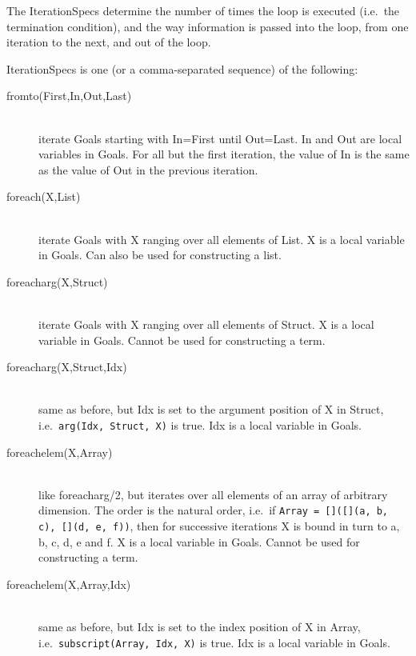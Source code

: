 The IterationSpecs determine the number of times the loop is executed
(i.e.\ the termination condition), and the way information is passed
into the loop, from one iteration to the next, and out of the loop.

IterationSpecs is one (or a comma-separated sequence) of the following:

\begin{description}
\item[fromto(First,In,Out,Last)]\ \\
%
    iterate Goals starting with In=First until Out=Last.
    In and Out are local variables in Goals. For all but the first
    iteration, the value of In is the same as the value of Out in the
    previous iteration.

\item[foreach(X,List)]\ \\
%
    iterate Goals with X ranging over all elements of List.
    X is a local variable in Goals.
    Can also be used for constructing a list.

\item[foreacharg(X,Struct)]\ \\
%
    iterate Goals with X ranging over all elements of Struct.
    X is a local variable in Goals.
    Cannot be used for constructing a term.

\item[foreacharg(X,Struct,Idx)]\ \\
    same as before, but Idx is set to the argument position of X in Struct,
    i.e.\ \verb+arg(Idx, Struct, X)+ is true.
    Idx is a local variable in Goals.

\item[foreachelem(X,Array)]\ \\
%
    like foreacharg/2, but iterates over all elements of an array
    of arbitrary dimension.  The order is the natural order, i.e.\
    if \verb+Array = []([](a, b, c), [](d, e, f))+, then for successive
    iterations X is bound in turn to a, b, c, d, e and f.
    X is a local variable in Goals.
    Cannot be used for constructing a term.

\item[foreachelem(X,Array,Idx)]\ \\
    same as before, but Idx is set to the index position of X in
    Array, i.e.\ \verb+subscript(Array, Idx, X)+ is true.
    Idx is a local variable in Goals.


\end{description}
